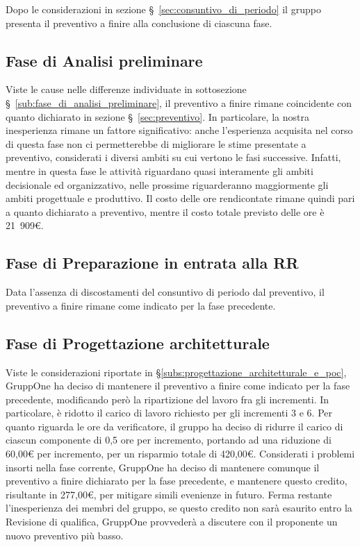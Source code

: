 \documentclass[../piano-di-progetto.tex]{subfiles}
\begin{document}
Dopo le considerazioni in sezione §~\ref{sec:consuntivo_di_periodo} il gruppo presenta il preventivo a finire alla conclusione di ciascuna fase.
\subsection{Fase di Analisi preliminare}%
\label{sub:fase_di_analisi_preliminare_2}
Viste le cause nelle differenze individuate in sottosezione §~\ref{sub:fase_di_analisi_preliminare}, il preventivo a finire rimane coincidente con quanto dichiarato in sezione §~\ref{sec:preventivo}. In particolare, la nostra inesperienza rimane un fattore significativo: anche l'esperienza acquisita nel corso di questa fase non ci permetterebbe di migliorare le stime presentate a preventivo, considerati i diversi ambiti su cui vertono le fasi successive.
Infatti, mentre in questa fase le attività riguardano quasi interamente gli ambiti decisionale ed organizzativo, nelle prossime riguarderanno maggiormente gli ambiti progettuale e produttivo.
Il costo delle ore rendicontate rimane quindi pari a quanto dichiarato a preventivo, mentre il costo totale previsto delle ore è 21~909€.
\subsection{Fase di Preparazione in entrata alla RR}%
\label{sub:preventivo_a_finire/fase_di_preparazione_in_entrata_alla_rr}
Data l'assenza di discostamenti del consuntivo di periodo dal preventivo, il preventivo a finire rimane come indicato per la fase precedente.
\subsection{Fase di Progettazione architetturale}%
\label{sub:preventivo_a_finire/fase_di_progettazione_architetturale}

Viste le considerazioni riportate in §\ref{subs:progettazione_architetturale_e_poc}, GruppOne ha deciso di mantenere il preventivo a finire come indicato per la fase precedente, modificando però la ripartizione del lavoro fra gli incrementi. In particolare, è ridotto il carico di lavoro richiesto per gli incrementi 3 e 6.
Per quanto riguarda le ore da verificatore, il gruppo ha deciso di ridurre il carico di ciascun componente di 0,5 ore per incremento, portando ad una riduzione di 60,00€ per incremento, per un risparmio totale di 420,00€.
Considerati i problemi insorti nella fase corrente, GruppOne ha deciso di mantenere comunque il preventivo a finire dichiarato per la fase precedente, e mantenere questo credito, risultante in 277,00€, per mitigare simili evenienze in futuro.
Ferma restante l'inesperienza dei membri del gruppo, se questo credito non sarà esaurito entro la Revisione di qualifica, GruppOne provvederà a discutere con il proponente un nuovo preventivo più basso.

\end{document}
